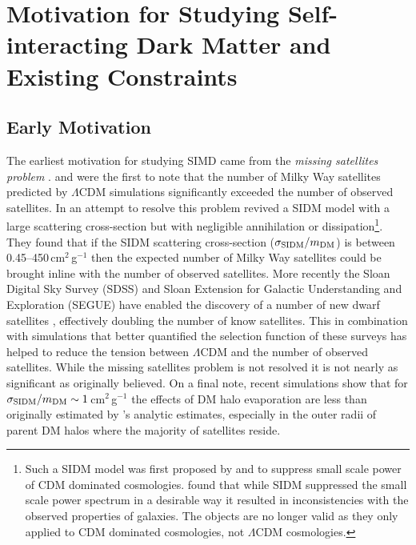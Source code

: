 \section{Motivation for Studying Self-interacting Dark Matter and Existing Constraints}

\subsection{Early Motivation}

The earliest motivation for studying SIMD came from the \textit{missing satellites problem} \citep[see][for a thorough review]{Bullock:2010uv}.
\citet{Moore:1999ja} and \citet{Klypin:1999ej} were the first to note that the number of Milky Way satellites predicted by $\Lambda$CDM simulations significantly exceeded the number of observed satellites.
In an attempt to resolve this problem \citet{Spergel:2000cb} revived a SIDM model with a large scattering cross-section but with negligible annihilation or dissipation\footnote{Such a SIDM model was first proposed by \citet{Carlson:1992cp} and \citet{Machacek:1994kj} to suppress small scale power of CDM dominated cosmologies.  \citet{deLaix:1995ey} found that while SIDM suppressed the small scale power spectrum in a desirable way it resulted in inconsistencies with the observed properties of galaxies.  The \citet{deLaix:1995ey} objects are no longer valid as they only applied to CDM dominated cosmologies, not $\Lambda$CDM cosmologies.}. 
They found that if the SIDM scattering cross-section ($\sigma_{\rm SIDM}/m_{\rm DM}$) is between 0.45--450\,cm$^2$\,g$^{-1}$ then the expected number of Milky Way satellites could be brought inline with the number of observed satellites.
More recently the Sloan Digital Sky Survey (SDSS) and Sloan Extension for Galactic Understanding and Exploration (SEGUE) have enabled the discovery of a number of new dwarf satellites \citep[see][for a review]{Willman:2010fg}, effectively doubling the number of know satellites.
This in combination with simulations that better quantified the selection function of these surveys has helped to reduce the tension between $\Lambda$CDM and the number of observed satellites.
While the missing satellites problem is not resolved it is not nearly as significant as originally believed.
On a final note, recent simulations \citep{Rocha:2012tr} show that for $\sigma_{\rm SIDM}/m_{\rm DM} \sim 1$\,cm$^2$\,g$^{-1}$ the effects of DM halo evaporation are less than originally estimated by \citet{Spergel:2000cb}'s analytic estimates, especially in the outer radii of parent DM halos where the majority of satellites reside.

